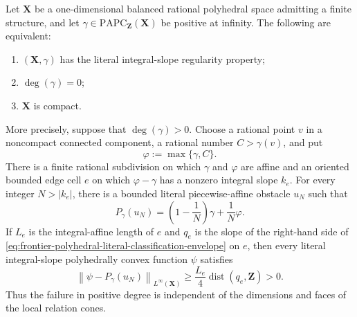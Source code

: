 
\begin{theorem}
\label{thm:frontier-polyhedral-one-dimensional-literal-classification}
Let $\mathbf X$ be a one-dimensional balanced rational polyhedral space
admitting a finite structure, and let
$\gamma\in\mathrm{PAPC}_{\mathbf Z}(\mathbf X)$ be positive at infinity.
The following are equivalent:
\begin{enumerate}
\item $(\mathbf X,\gamma)$ has the literal integral-slope regularity
property;
\item $\deg(\gamma)=0$;
\item $\mathbf X$ is compact.
\end{enumerate}

More precisely, suppose that $\deg(\gamma)>0$.  Choose a rational point $v$
in a noncompact connected component, a rational number $C>\gamma(v)$, and
put
\[
                 \varphi:=\max\{\gamma,C\}.
\]
There is a finite rational subdivision on which $\gamma$ and $\varphi$ are
affine and an oriented bounded edge cell $e$ on which
$\varphi-\gamma$ has a nonzero integral slope $k_e$.  For every integer
$N>|k_e|$, there is a bounded literal piecewise-affine obstacle $u_N$ such
that
\begin{equation}
 P_\gamma(u_N)
 =\left(1-\frac1N\right)\gamma+\frac1N\varphi.
 \label{eq:frontier-polyhedral-literal-classification-envelope}
\end{equation}
If $L_e$ is the integral-affine length of $e$ and $q_e$ is the slope of the
right-hand side of
\eqref{eq:frontier-polyhedral-literal-classification-envelope} on $e$, then
every literal integral-slope polyhedrally convex function $\psi$ satisfies
\begin{equation}
 \left\lVert\psi-P_\gamma(u_N)\right\rVert_{L^\infty(\mathbf X)}
 \geq \frac{L_e}{4}\operatorname{dist}(q_e,\mathbf Z)>0.
 \label{eq:frontier-polyhedral-literal-classification-separation}
\end{equation}
Thus the failure in positive degree is independent of the dimensions and
faces of the local relation cones.
\end{theorem}
